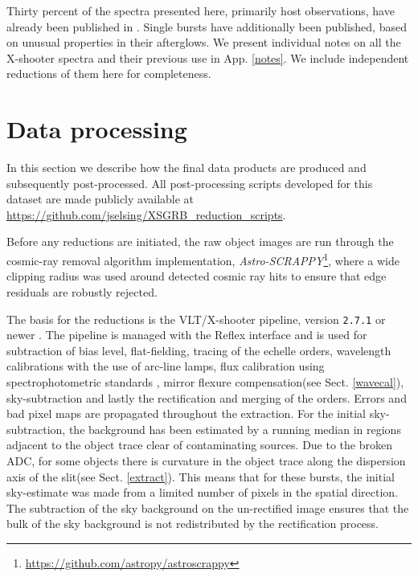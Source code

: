 \documentclass[longauth]{aa}    %
\begin{document}
Thirty percent of the spectra presented here, primarily host observations, have
already been published in \citet{Kruhler2015}. Single bursts have additionally
been published, based on unusual properties in their afterglows. We present
individual notes on all the X-shooter spectra and their previous use in App.
\ref{notes}. We include independent reductions of them here for completeness.

\section{Data processing} \label{proc}

In this section we describe how the final data products are produced and
subsequently post-processed. 
All post-processing scripts developed for this dataset are made publicly
available at \url{https://github.com/jselsing/XSGRB_reduction_scripts}.

Before any reductions are initiated, the raw object images are run through the
cosmic-ray removal algorithm \citep{VanDokkum2001} implementation,
\textit{Astro-SCRAPPY}\footnote{\url{https://github.com/astropy/astroscrappy}},
where a wide clipping radius was used around detected cosmic ray hits to ensure
that edge residuals are robustly rejected.

The basis for the reductions is the VLT/X-shooter pipeline, version
\texttt{2.7.1} or newer \citep{Goldoni2006, Modigliani2010}. The pipeline is
managed with the Reflex interface \citep{Freudling2013} and is used for
subtraction of bias level, flat-fielding, tracing of the echelle orders,
wavelength calibrations with the use of arc-line lamps, flux calibration using
spectrophotometric standards \citep{Vernet2010, Hamuy1994}, mirror flexure
compensation(see Sect. \ref{wavecal}), sky-subtraction and lastly the
rectification and merging of the orders. Errors and bad pixel maps are
propagated throughout the extraction. For the initial sky-subtraction, the
background has been estimated by a running median in regions adjacent to the
object trace clear of contaminating sources. Due to the broken ADC, for some
objects there is curvature in the object trace along the dispersion axis of the
slit(see Sect. \ref{extract}). This means that for these bursts, the initial
sky-estimate was made from a limited number of pixels in the spatial direction.
The subtraction of the sky background on the un-rectified image ensures that the
bulk of the sky background is not redistributed by the rectification process.
\end{document}
